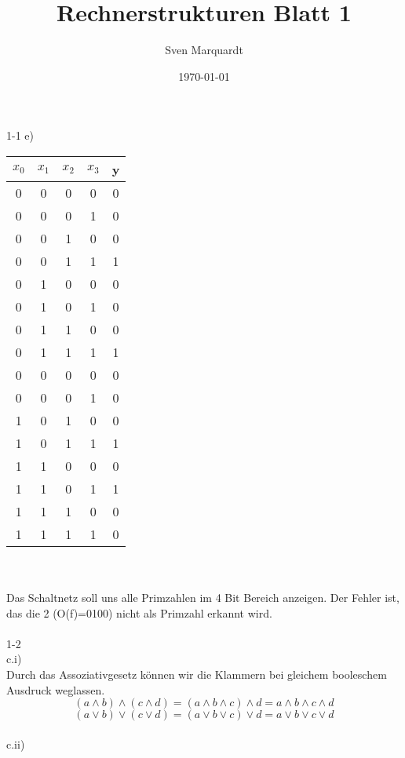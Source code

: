 \documentclass[11pt,a4paper]{article}
\title{Rechnerstrukturen Blatt 1}
\author{Sven Marquardt}
\date{\today}
\begin{document}
1-1 e)
\\
\begin{tabular}{c | c | c | c | c}
$x_0$ & $x_1$ & $x_2$& $x_3$ & y \\ \hline
0&0&0&0&0\\
0&0&0&1&0\\ \hline
0&0&1&0&0\\ \hline
0&0&1&1&1\\ \hline
0&1&0&0&0\\
0&1&0&1&0\\
0&1&1&0&0\\
0&1&1&1&1\\ \hline
0&0&0&0&0\\
0&0&0&1&0\\
1&0&1&0&0\\
1&0&1&1&1\\ \hline
1&1&0&0&0\\
1&1&0&1&1\\
1&1&1&0&0\\
1&1&1&1&0\\
\end{tabular}
\\
\\
Das Schaltnetz soll uns alle Primzahlen im 4 Bit Bereich anzeigen. Der Fehler ist, das die 2 (O(f)={0100}) nicht als Primzahl erkannt wird. \\ \\
1-2\\
c.i)\\
Durch das Assoziativgesetz  können wir die Klammern bei gleichem booleschem Ausdruck weglassen.
\begin{equation}
\label{Assoziativ1}
( a \wedge b) \wedge (c \wedge d) = (a \wedge b \wedge c) \wedge d=a \wedge b \wedge c \wedge d 
\end{equation}
\begin{equation}
( a \vee b)\vee (c \vee d)= (a \vee b \vee c) \vee d= a \vee b \vee c \vee d
\end{equation}
\\
c.ii)\\
\end{document}
